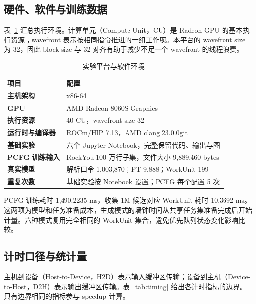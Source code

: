 \documentclass[UTF8,11pt,a4paper]{ctexart}
\begin{document}
\subsection{硬件、软件与训练数据}

表~\ref{tab:platform} 汇总执行环境。计算单元（Compute Unit，CU）是 Radeon GPU 的基本执行资源；wavefront 表示按相同指令推进的一组工作项。本平台的 wavefront size 为 32，因此 block size 与 32 对齐有助于减少不足一个 wavefront 的线程浪费。

\begin{table}[H]
\centering
\caption{实验平台与软件环境}
\label{tab:platform}
\begin{tabularx}{0.92\textwidth}{>{\bfseries}p{3.5cm}X}
\toprule
项目 & 配置 \\
\midrule
主机架构 & x86-64 \\
GPU & AMD Radeon 8060S Graphics \\
执行资源 & 40 CU，wavefront size 32 \\
运行时与编译器 & ROCm/HIP 7.13，AMD clang 23.0.0git \\
基础实验 & 六个 Jupyter Notebook，完整保留代码、输出与图 \\
PCFG 训练输入 & RockYou 100 万行子集，文件大小 9,889,460 bytes \\
真实模型 & 解析口令 1,003,870；PT 9,888；WorkUnit 199 \\
重复次数 & 基础实验按 Notebook 设置；PCFG 每个配置 5 次 \\
\bottomrule
\end{tabularx}
\end{table}

PCFG 训练耗时 1,490.2235 ms，收集 1M 候选对应 WorkUnit 耗时 10.3692 ms。这两项为模型和任务准备成本，生成模式的墙钟时间从共享任务集准备完成后开始计量。六种模式复用完全相同的 WorkUnit 集合，避免优先队列状态变化影响比较。

\subsection{计时口径与统计量}

主机到设备（Host-to-Device，H2D）表示输入缓冲区传输；设备到主机（Device-to-Host，D2H）表示输出缓冲区传输。表~\ref{tab:timing} 给出各计时指标的边界。只有边界相同的指标参与 speedup 计算。
\end{document}
